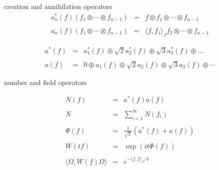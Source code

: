 \documentclass[8pt]{beamer}
\begin{document}
\begin{frame}{creation and annihilation operators}
\[
\begin{array}{lll} a_n^*(f)(f_1\otimes \cdots \otimes f_{n-1}) & = & f\otimes f_1\otimes \cdots \otimes f_{n-1} \\ \\ 
  a_n(f)(f_1\otimes\cdots\otimes f_{n-1}) & = & \langle f,f_1\rangle
  _J f_2\otimes\cdots \otimes f_{n-1} \end{array} \]

\bigskip

\[
\begin{array}{lll}
  a^*(f) & = & a_1^*(f) \oplus \sqrt{2}a^*_2(f)\oplus \sqrt{3}a_3^*(f)\oplus \dots \\ \\
  a(f) & = & 0\oplus a_1(f)\oplus \sqrt{2}a_2(f)\oplus \sqrt{3}a_3(f)\oplus \cdots \end{array} \]




\end{frame}
\begin{frame}{number and field operators}

\[ 
\begin{array}{lll}
N(f) & = & a^*(f)a(f) \\ \\
N & = & \sum _{i=1}^\infty N(f_i) \\ \\ 
\Phi (f) & = & \frac{1}{\sqrt{2}}(a^*(f)+a(f)) \\ \\
W(tf) & = & \exp (it\Phi (f)) \\ \\ 
\langle \Omega ,W(f)\Omega\rangle & = & e^{-\langle f,f\rangle _J/4} \end{array} \]


\end{frame}
\end{document}
